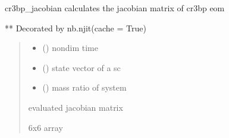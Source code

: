 \documentclass[letterpaper,10pt,english]{sphinxmanual}
\begin{document}
\begin{fulllineitems}
\label{\detokenize{models:pyraa.models.cr3bp_jacobian}}
\pysigstartsignatures
{}
\pysigstopsignatures
\sphinxAtStartPar
cr3bp\_jacobian \sphinxhyphen{} calculates the jacobian matrix of cr3bp eom

\sphinxAtStartPar
** Decorated by nb.njit(cache = True)
\begin{quote}\begin{description}
\begin{itemize}
\item {} 
\sphinxAtStartPar
{} () \sphinxhyphen{}\sphinxhyphen{} non\sphinxhyphen{}dim time

\item {} 
\sphinxAtStartPar
{} () \sphinxhyphen{}\sphinxhyphen{} state vector of a sc

\item {} 
\sphinxAtStartPar
{} () \sphinxhyphen{}\sphinxhyphen{} mass ratio of system

\end{itemize}

\sphinxAtStartPar
{} \sphinxhyphen{}\sphinxhyphen{} evaluated jacobian matrix

\sphinxAtStartPar
6x6 array

\end{description}\end{quote}

\end{fulllineitems}

\end{document}
